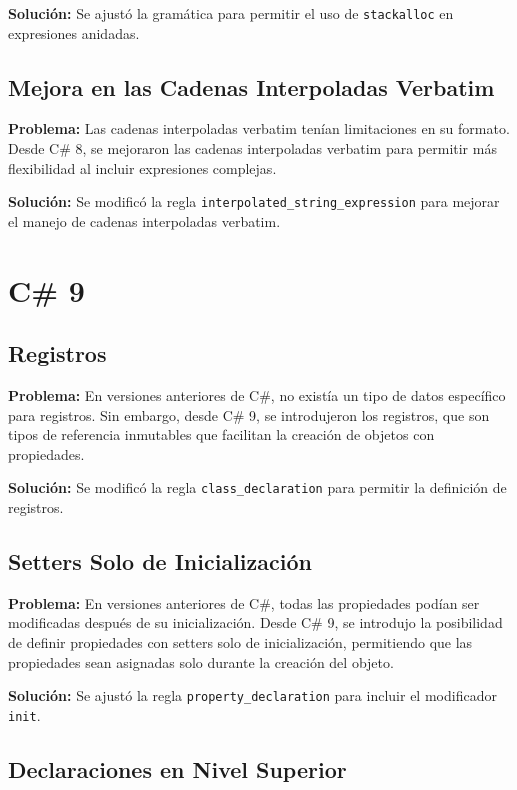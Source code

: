 \textbf{Solución:} Se ajustó la gramática para permitir el uso de \texttt{stackalloc} en expresiones anidadas.

\subsection{Mejora en las Cadenas Interpoladas Verbatim}
\textbf{Problema:} Las cadenas interpoladas verbatim tenían limitaciones en su formato. Desde C\# 8, se mejoraron las cadenas interpoladas verbatim para permitir más flexibilidad al incluir expresiones complejas.

\textbf{Solución:} Se modificó la regla \texttt{interpolated\_string\_expression} para mejorar el manejo de cadenas interpoladas verbatim.



\section{C\# 9}

\subsection{Registros}

\textbf{Problema:} En versiones anteriores de C\#, no existía un tipo de datos específico para registros. Sin embargo, desde C\# 9, se introdujeron los registros, que son tipos de referencia inmutables que facilitan la creación de objetos con propiedades.

\textbf{Solución:} Se modificó la regla \texttt{class\_declaration} para permitir la definición de registros.

\subsection{Setters Solo de Inicialización}

\textbf{Problema:} En versiones anteriores de C\#, todas las propiedades podían ser modificadas después de su inicialización. Desde C\# 9, se introdujo la posibilidad de definir propiedades con setters solo de inicialización, permitiendo que las propiedades sean asignadas solo durante la creación del objeto.

\textbf{Solución:} Se ajustó la regla \texttt{property\_declaration} para incluir el modificador \texttt{init}.

\subsection{Declaraciones en Nivel Superior}

